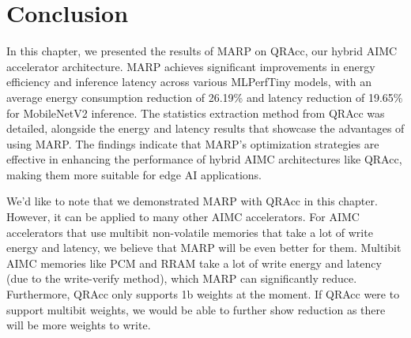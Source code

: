 



\section{Conclusion}

In this chapter, we presented the results of MARP on QRAcc, our hybrid AIMC accelerator architecture. MARP achieves significant improvements in energy efficiency and inference latency across various MLPerfTiny models, with an average energy consumption reduction of 26.19\% and latency reduction of 19.65\% for MobileNetV2 inference. The statistics extraction method from QRAcc was detailed, alongside the energy and latency results that showcase the advantages of using MARP. The findings indicate that MARP's optimization strategies are effective in enhancing the performance of hybrid AIMC architectures like QRAcc, making them more suitable for edge AI applications.

We'd like to note that we demonstrated MARP with QRAcc in this chapter. However, it can be applied to many other AIMC accelerators. For AIMC accelerators that use multibit non-volatile memories that take a lot of write energy and latency, we believe that MARP will be even better for them. Multibit AIMC memories like PCM and RRAM take a lot of write energy and latency (due to the write-verify method), which MARP can significantly reduce. Furthermore, QRAcc only supports 1b weights at the moment. If QRAcc were to support multibit weights, we would be able to further show reduction as there will be more weights to write.